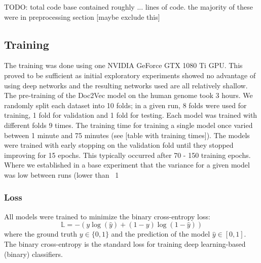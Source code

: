 TODO: total code base contained roughly ... lines of code. the majority of these were in preprocessing section [maybe exclude this]

\subsection{Training} \label{subsec:training_details}
The training was done using one NVIDIA GeForce GTX 1080 Ti GPU. This proved to be sufficient as initial exploratory experiments showed no advantage of using deep networks and the resulting networks used are all relatively shallow. The pre-training of the Doc2Vec model on the human genome took 3 hours. We randomly split each dataset into 10 folds; in a given run, 8 folds were used for training, 1 fold for validation and 1 fold for testing. Each model was trained with different folds 9 times.
The training time for training a single model once varied between 1 minute and 75 minutes (see [table with training times]). The models were trained with early stopping on the validation fold until they stopped improving for 15 epochs. This typically occurred after 70 - 150 training epochs.
Where we established in a base experiment that the variance for a given model was low between runs (lower than ~1%
\subsubsection{Loss}  \label{subsubsec:loss}
All models were trained to minimize the binary cross-entropy loss:
$$\mathbb{L} = - (y \log(\hat{y}) + (1 - y) \log (1 - \hat{y}))$$
where the ground truth $y \in \{0, 1\}$ and the prediction of the model $\hat{y} \in [0, 1]$. The binary cross-entropy is the standard loss for training deep learning-based (binary) classifiers.
